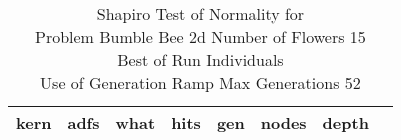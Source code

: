\begin{table}[H]
\caption{Shapiro Test of Normality for \\ Problem  Bumble Bee 2d  Number of Flowers 15\\Best of Run Individuals \\ Use of Generation Ramp  Max Generations 52\\}
\begin{center}
\scalebox{0.8} %
{
\begin{tabular}{lrrrrrrr}
\hline
kern & adfs & what & hits & gen & nodes & depth \\
\hline


\end{tabular}
}
\end{center}
\end{table}

